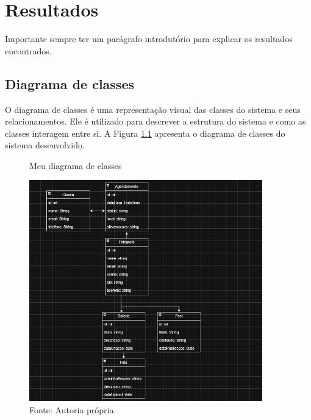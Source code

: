 \chapter{Resultados}
\label{chap:result}
Importante sempre ter um parágrafo introdutório para explicar os resultados encontrados.




\section{Diagrama de classes}
\label{sec:class}
O diagrama de classes é uma representação visual das classes do sistema e seus relacionamentos. Ele é utilizado para descrever a estrutura do sistema e como as classes interagem entre si. A Figura \ref{fig:diagrama_classes} apresenta o diagrama de classes do sistema desenvolvido.
\begin{figure} [h!]	
    \centering
    \caption{Meu diagrama de classes}
    \includegraphics[width=0.9\textwidth]{Figures/Diagrama_de_Classes.png}
    \caption*{Fonte: Autoria própria.}
    \label{fig:diagrama_classes}
\end{figure}

